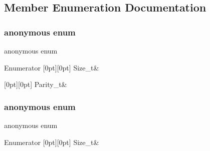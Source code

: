 \subsection{Member Enumeration Documentation}
\mbox{\label{structHadron_1_1HgRep_a28a92766125066036e71f5b29771b239}} 
\subsubsection{\texorpdfstring{anonymous enum}{anonymous enum}}
{\footnotesize\ttfamily anonymous enum}

\begin{DoxyEnumFields}{Enumerator}
[0pt][0pt]{}\mbox{\label{structHadron_1_1HgRep_acff328f18994ef32cfe11a8a4ae209c9a7090534cc35068f510d194147450b3f7}} 
Size\+\_\+t&\\
\hline

[0pt][0pt]{}\mbox{\label{structHadron_1_1HgRep_a28a92766125066036e71f5b29771b239a6a4af3d47d749e6cf2c053f22db038be}} 
Parity\+\_\+t&\\
\hline

\end{DoxyEnumFields}
\mbox{\label{structHadron_1_1HgRep_acdcc2812d683ce2593847abd37e563f3}} 
\subsubsection{\texorpdfstring{anonymous enum}{anonymous enum}}
{\footnotesize\ttfamily anonymous enum}

\begin{DoxyEnumFields}{Enumerator}
[0pt][0pt]{}\mbox{\label{structHadron_1_1HgRep_acff328f18994ef32cfe11a8a4ae209c9a7090534cc35068f510d194147450b3f7}} 
Size\+\_\+t&\\
\hline

\end{DoxyEnumFields}
\mbox{\label{structHadron_1_1HgRep_acff328f18994ef32cfe11a8a4ae209c9}} 
